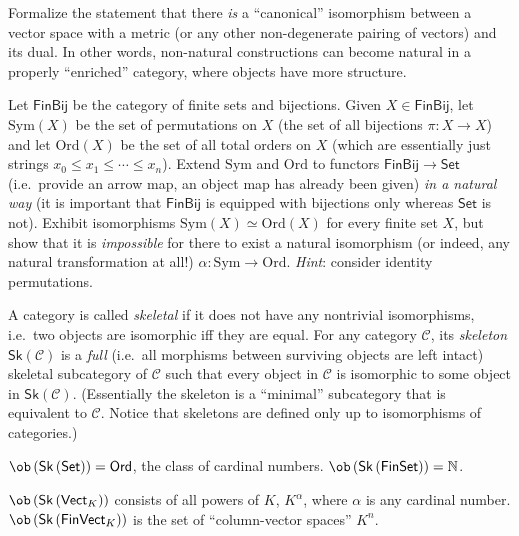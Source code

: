 %
\begin{xca}
    Formalize the statement that there \emph{is} a ``canonical'' isomorphism between a vector space with a metric (or any other non-degenerate pairing of vectors) and its dual. In other words, non-natural constructions can become natural in a properly ``enriched'' category, where objects have more structure.
\end{xca}
%
\begin{xca}
    Let $\mathsf{FinBij}$ be the category of finite sets and bijections. Given $X\in\mathsf{FinBij}$, let $\mathrm{Sym}(X)$ be the set of permutations on $X$ (the set of all bijections $\pi:X\to X$) and let $\mathrm{Ord}(X)$ be the set of all total orders on $X$ (which are essentially just strings $x_0\le x_1\le\cdots\le x_n$). Extend $\mathrm{Sym}$ and $\mathrm{Ord}$ to functors $\mathsf{FinBij}\to\mathsf{Set}$ (i.e.\ provide an arrow map, an object map has already been given) \emph{in a natural way} (it is important that $\mathsf{FinBij}$ is equipped with bijections only whereas $\mathsf{Set}$ is not). Exhibit isomorphisms $\mathrm{Sym}(X)\simeq\mathrm{Ord}(X)$ for every finite set $X$, but show that it is \emph{impossible} for there to exist a natural isomorphism (or indeed, any natural transformation at all!) $\alpha:\mathrm{Sym}\to\mathrm{Ord}$. \emph{Hint}: consider identity permutations.
\end{xca}
%
\begin{defn}[Skeleton]
A category is called \emph{skeletal} if it does not have any nontrivial
isomorphisms, i.e.\ two objects are isomorphic iff they are equal.
For any category $\mathcal{C}$, its \emph{skeleton} $\mathsf{Sk}\left(\mathcal{C}\right)$
is a \emph{full} (i.e.\ all morphisms between surviving objects are left intact) skeletal subcategory
of $\mathcal{C}$ such that every object in $\mathcal{C}$ is isomorphic
to some object in $\mathsf{Sk}\left(\mathcal{C}\right)$. (Essentially
the skeleton is a ``minimal'' subcategory that is equivalent to
$\mathcal{C}$. Notice that skeletons are defined only up to isomorphisms
of categories.)
\end{defn}
\begin{example}
$\ob\left(\mathsf{Sk}\left(\mathsf{Set}\right)\right)=\mathsf{Ord}$,
the class of cardinal numbers. $\ob\left(\mathsf{Sk}\left(\mathsf{FinSet}\right)\right)=\mathbb{N}$. 
\end{example}
%
\begin{example}
$\ob\left(\mathsf{Sk}\left(\mathsf{Vect}_{K}\right)\right)$ consists
of all powers of $K$, $K^{\alpha}$, where $\alpha$ is any cardinal
number. $\ob\left(\mathsf{Sk}\left(\mathsf{FinVect}_{K}\right)\right)$
is the set of ``column-vector spaces'' $K^{n}$.
\end{example}
